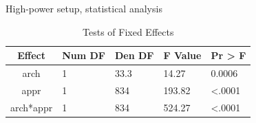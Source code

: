 

\begin{table}[h]
    \caption{High-power setup, statistical analysis}
	\begin{subtable}[h]{0.47\textwidth}
	    \centering
	    \caption{Tests of Fixed Effects}
	    \begin{adjustbox}{max width=0.6\columnwidth}
		\begin{tabular}{>{\columncolor[rgb]{0.93,0.95,0.98}}cllll}
        \toprule
        \rowcolor[rgb]{0.93,0.95,0.98}
            \color[rgb]{0.07,0.13,0.47}\textbf{Effect} &
            \color[rgb]{0.07,0.13,0.47}\textbf{Num DF} &
            \color[rgb]{0.07,0.13,0.47}\textbf{Den DF} &
            \color[rgb]{0.07,0.13,0.47}\textbf{F Value} &
            \color[rgb]{0.07,0.13,0.47}\textbf{Pr > F} \\
        \midrule
        arch           & 1 & 33.3 & 14.27 & 0.0006 \\
        \midrule
        appr           & 1 & 834 & 193.82 & \textless{}.0001 \\
        \midrule
        arch*appr           & 1 & 834 & 524.27 & \textless{}.0001 \\
        \bottomrule
        \end{tabular}
		\end{adjustbox}
	\label{tab:hp_tab_1}
	\end{subtable}
	\hfill


\end{table}
